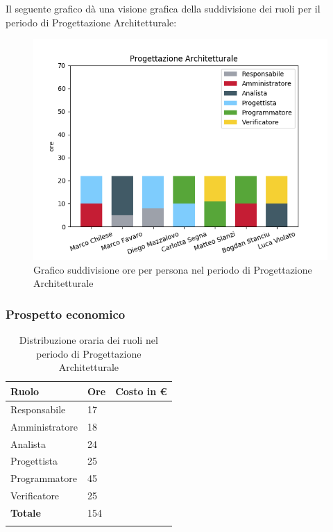 Il seguente grafico dà una visione grafica della suddivisione dei ruoli per il periodo di Progettazione Architetturale:

\begin{figure}[H]
	\centering
  		\includegraphics[width=1\linewidth]{./images/fig_pa.png}
  		\caption{Grafico suddivisione ore per persona nel periodo di Progettazione Architetturale}
  		\label{fig:grafico suddivione ruoli periodo di pa}
\end{figure}



\subsubsection{Prospetto economico}
\begin{longtable}{| C{.30\textwidth}| C{.15\textwidth}| C{.20\textwidth}|}
\hline
\textbf{Ruolo} & \textbf{Ore} & \textbf{Costo in \euro} \\
\hline 
Responsabile & 17 &  \\
\hline
Amministratore & 18 & \\
\hline
Analista & 24 &  \\
\hline
Progettista & 25 &  \\
\hline
Programmatore & 45 &  \\
\hline
Verificatore & 25 &  \\
\hline
\textbf{Totale} & 154 & \\ 
\hline

\caption{Distribuzione oraria dei ruoli nel periodo di Progettazione Architetturale}
\label{Distribuzione oraria del periodo di pa}
\end{longtable}

